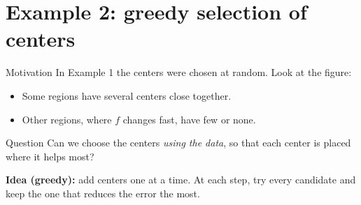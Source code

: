 \documentclass[10pt,aspectratio=169]{beamer}
\begin{document}
\section{Example 2: greedy selection of centers}

\begin{frame}{Motivation}
  In Example 1 the centers were chosen at random. Look at the figure:
  \begin{itemize}
    \item Some regions have several centers close together.
    \item Other regions, where $f$ changes fast, have few or none.
  \end{itemize}
  \vspace{0.5em}
  \begin{alertblock}{Question}
    Can we choose the centers \emph{using the data}, so that each center is
    placed where it helps most?
  \end{alertblock}
  \vspace{0.5em}
  \textbf{Idea (greedy):} add centers one at a time. At each step, try every
  candidate and keep the one that reduces the error the most.
\end{frame}
\end{document}
